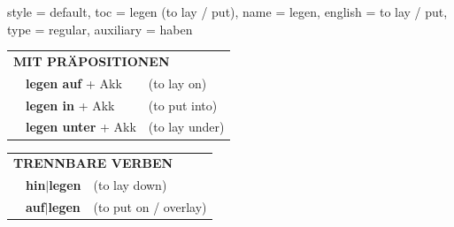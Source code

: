\begin{verbentry}{
  style = {default},
  toc = {legen (to lay / put)},
  name = {legen},
  english = {to lay / put},
  type = {regular},
  auxiliary = {haben}
}
\vspace{10pt}

\begin{tabular}{lll}
\multicolumn{3}{l}{\textbf{MIT PRÄPOSITIONEN}}\\
& \textbf{legen auf} + Akk & (to lay on)\\
& \textbf{legen in} + Akk & (to put into)\\
& \textbf{legen unter} + Akk & (to lay under)\\
\end{tabular}
\hfill
\begin{tabular}{lll}
\multicolumn{3}{l}{\textbf{TRENNBARE VERBEN}}\\
& \textbf{hin$|$legen} & (to lay down)\\
& \textbf{auf$|$legen} & (to put on / overlay)\\
\end{tabular}
\vspace{-5pt}
\end{verbentry}

